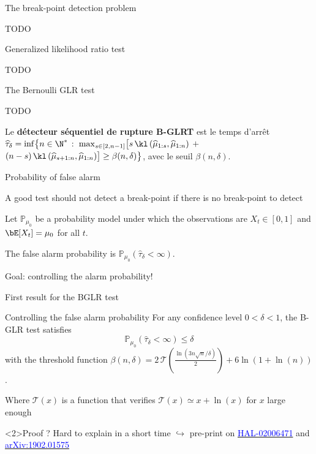 \documentclass[11pt,english,ignorenonframetext,]{beamer}
\begin{document}
\begin{frame}{The break-point detection problem}

  TODO

\end{frame}

\begin{frame}{Generalized likelihood ratio test}

  TODO

\end{frame}

\begin{frame}{The Bernoulli GLR test}

  TODO

  Le \textbf{détecteur séquentiel de rupture B-GLRT} est le temps d'arrêt $\widehat{\tau}_{\delta} = \inf \bigl\{ n \in \N^*$ $:$ $\max_{s \in [2,n-1]} \bigl[s \, \kl\left(\widehat{\mu}_{1:s},\widehat{\mu}_{1:n}\right)$ $+$ $(n-s) \, \kl\left(\widehat{\mu}_{s+1:n},\widehat{\mu}_{1:n}\right)\bigr] \geq \beta(n,\delta) \bigr\}$, avec le seuil $\beta(n,\delta)$.

\end{frame}

\begin{frame}{Probability of false alarm}

  A good test should not detect a break-point if there is no break-point to detect

  \begin{block}
    Let $\mathbb{P}_{\mu_0}$ be a probability model under which the observations are $X_t \in[0,1]$
    and $\bE[X_t] = \mu_0$ for all $t$.

    The \alert{false alarm probability} is $\mathbb{P}_{\mu_0}(\widehat{\tau}_\delta < \infty)$.
  \end{block}

  \alert{Goal: controlling the alarm probability!}

\end{frame}

\begin{frame}{First result for the BGLR test}

  \begin{block}{Controlling the false alarm probability}
    For any confidence level $0<\delta<1$,
    the B-GLR test satisfies
    \[ \mathbb{P}_{\mu_0}(\widehat{\tau}_\delta < \infty) \leq \delta \]
    with the threshold function
    $\beta(n,\delta)= 2\,\mathcal{T}(\frac{\ln(3n\sqrt{n}/\delta)}{2}) + 6\ln(1+\ln(n))$.
  \end{block}

  Where $\mathcal{T}(x)$ is a function that verifies $\mathcal{T}(x)\simeq x + \ln(x)$ for $x$ large enough

  \begin{exampleblock}<2>{Proof ?}
    Hard to explain in a short time
    $\hookrightarrow$ pre-print on
    \href{https://hal.inria.fr/hal-02006471}{\textcolor{blue}{HAL-02006471}}
    and
    \href{https://arxiv.org/abs/1902.01575}{\textcolor{blue}{arXiv:1902.01575}}
  \end{exampleblock}

\end{frame}
\end{document}
